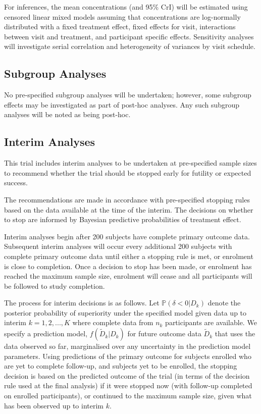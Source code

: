 \documentclass{bmcart}
\begin{document}
For inferences, the mean concentrations (and 95\% CrI) will be estimated using censored linear mixed models assuming that concentrations are log-normally distributed with a fixed treatment effect, fixed effects for visit, interactions between visit and treatment, and participant specific effects.
Sensitivity analyses will investigate serial correlation and heterogeneity of variances by visit schedule.

\subsection*{Subgroup Analyses}

No pre-specified subgroup analyses will be undertaken; however, some subgroup effects may be investigated as part of post-hoc analyses.
Any such subgroup analyses will be noted as being post-hoc.

\subsection*{Interim Analyses}

This trial includes interim analyses to be undertaken at pre-specified sample sizes to recommend whether the trial should be stopped early for futility or expected success.

The recommendations are made in accordance with pre-specified stopping rules based on the data available at the time of the interim.
The decisions on whether to stop are informed by Bayesian predictive probabilities of treatment effect.

Interim analyses begin after 200 subjects have complete primary outcome data.
Subsequent interim analyses will occur every additional 200 subjects with complete primary outcome data until either a stopping rule is met, or enrolment is close to completion.
Once a decision to stop has been made, or enrolment has reached the maximum sample size, enrolment will cease and all participants will be followed to study completion.

The process for interim decisions is as follows.
Let $\mathbb P(\delta < 0|D_k)$ denote the posterior probability of superiority under the specified model given data up to interim $k=1,2,...,K$ where complete data from $n_k$ participants are available.
We specify a prediction model, $f(\tilde D_k|D_k)$ for future outcome data $\tilde D_k$ that uses the data observed so far, marginalised over any uncertainty in the prediction model parameters.
Using predictions of the primary outcome for subjects enrolled who are yet to complete follow-up, and subjects yet to be enrolled, the stopping decision is based on the predicted outcome of the trial (in terms of the decision rule used at the final analysis) if it were stopped now (with follow-up completed on enrolled participants), or continued to the maximum sample size, given what has been observed up to interim $k$.
\end{document}
